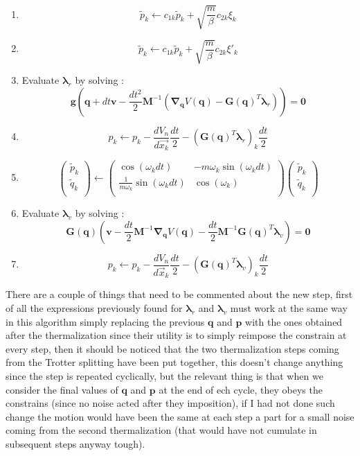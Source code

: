 \documentclass[10pt,a4paper]{article}
\begin{document}
\begin{enumerate}
	\item \[\tilde{p}_k \leftarrow c_{1k}\tilde{p}_k + \sqrt{\frac{m}{\beta}}c_{2k} \xi_k \]
	\item \[\tilde{p}_k \leftarrow c_{1k}\tilde{p}_k + \sqrt{\frac{m}{\beta}}c_{2k} \xi'_k \]
	\item Evaluate $\bm{\lambda}_r$ by solving :
	\[ \bm{g}(\bm{q} + dt\bm{v}-\frac{dt^2}{2}\bm{M}^{-1}(\bm{\nabla}_{\bm q}V(\bm{q})-\bm{G}(\bm{q})^T\bm{\lambda}_r)) = \bm{0} \]
	\item \[p_k \leftarrow p_k - \frac{dV_n}{d\vec{x_k}}\frac{dt}{2}-(\bm{G}(\bm{q})^T\bm{\lambda}_r)_k\frac{dt}{2}\]
	\item 
	\begin{equation}
	\begin{pmatrix} 
	\tilde{p}_k  \\
	\tilde{q}_k \\
	\end{pmatrix} 
	\leftarrow
	\begin{pmatrix} 
	\cos(\omega_k dt) & -m\omega_k \sin(\omega_k dt)   \\
	\frac{1}{m\omega_k}\sin(\omega_k dt) & \cos(\omega_k)  \\
	\end{pmatrix} 
	\begin{pmatrix} 
	\tilde{p}_k  \\
	\tilde{q}_k \\
	\end{pmatrix} 
	\end{equation}
	\item Evaluate $\bm{\lambda}_v$ by solving :
	\[
	\bm{G}(\bm{q})(\bm{v}-\frac{dt}{2}\bm{M}^{-1}\bm{\nabla}_{\bm q}V(\bm{q})-\frac{dt}{2}\bm{M}^{-1} \bm{G}(\bm{q})^T\bm{\lambda}_v) = \bm{0}
	\]
	\item \[ p_k \leftarrow p_k - \frac{dV_n}{d\vec{x}_k}\frac{dt}{2}-(\bm{G}(\bm{q})^T\bm{\lambda}_v)_k\frac{dt}{2}\]
	
\end{enumerate}

There are a couple of things that need to be commented about the new step, first of all the expressions previously found for $\bm{\lambda}_r$ and $\bm{\lambda}_v$ must work at the same way in this algorithm simply replacing the previous $\bm{q}$ and $\bm{p}$ with the ones obtained after the thermalization since their utility is to simply reimpose the constrain at every step, then it should be noticed that the two thermalization steps coming from the Trotter splitting have been put together, this doesn't change anything since the step is repeated cyclically, but the relevant thing is that when we consider the final values of $\bm{q}$ and $\bm{p}$ at the end of ech cycle, they obeys the constrains (since no noise acted after they imposition), if I had not done such change the motion would have been the same at each step a part for a small noise coming from the second thermalization (that would have not cumulate in subsequent steps anyway tough).
\end{document}
